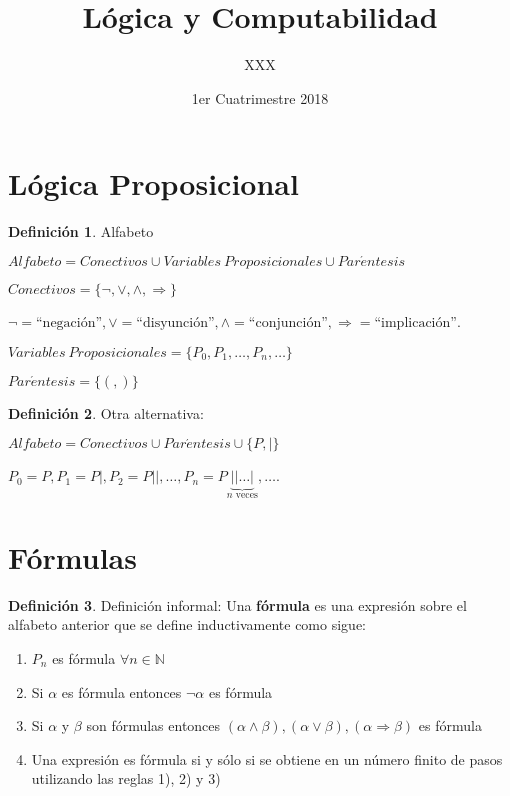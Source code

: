 \documentclass[a4paper,11pt]{article}
\title{Lógica y Computabilidad}
\author{XXX}
\date{1er Cuatrimestre 2018}
\theoremstyle{definition}
\newtheorem{defn}{Definición}[section]
\theoremstyle{remark}
\begin{document}
\maketitle

\section{Lógica Proposicional}

\begin{defn} Alfabeto

$Alfabeto = Conectivos \cup Variables\ Proposicionales \cup Par\acute entesis$

$Conectivos = \{ \neg, \vee, \wedge, \Rightarrow \}$

$\neg = \text{``negación''}, \vee = \text{``disyunción''}, \wedge = \text{``conjunción''},
\Rightarrow = \text{``implicación''}$.

$Variables\ Proposicionales = \{ P_0, P_1, \dots, P_n, \dots \}$

$Par\acute entesis = \{(,)\}$
\end{defn}

\begin{defn}
Otra alternativa: 

$Alfabeto = Conectivos \cup Par\acute entesis \cup \{P,|\}$

$P_0 = P, P_1 = P|, P_2 = P||, \dots, P_n = P\underbrace{||\dots|}_{n\text{ veces}}, \dots$.
\end{defn}

\section{Fórmulas}

\begin{defn}
Definición informal: Una \textbf{fórmula} es una expresión sobre el alfabeto anterior
que se define inductivamente como sigue:

\begin{enumerate}
\item $P_n$ es fórmula $\forall n \in \mathbb N$
\item Si $\alpha$ es fórmula entonces $\neg\alpha$ es fórmula
\item Si $\alpha$ y $\beta$ son fórmulas entonces $(\alpha \wedge \beta),
(\alpha \vee \beta), (\alpha \Rightarrow \beta)$ es fórmula
\item Una expresión es fórmula si y sólo si se obtiene en un 
número finito de pasos utilizando las reglas 1), 2) y 3)
\end{enumerate}

\end{defn}
\end{document}

